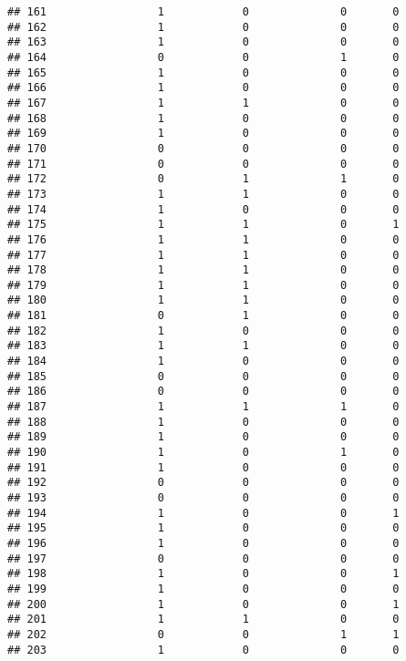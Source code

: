 \documentclass[]{article}
\begin{document}
\begin{verbatim}
## 161                 1            0              0       0
## 162                 1            0              0       0
## 163                 1            0              0       0
## 164                 0            0              1       0
## 165                 1            0              0       0
## 166                 1            0              0       0
## 167                 1            1              0       0
## 168                 1            0              0       0
## 169                 1            0              0       0
## 170                 0            0              0       0
## 171                 0            0              0       0
## 172                 0            1              1       0
## 173                 1            1              0       0
## 174                 1            0              0       0
## 175                 1            1              0       1
## 176                 1            1              0       0
## 177                 1            1              0       0
## 178                 1            1              0       0
## 179                 1            1              0       0
## 180                 1            1              0       0
## 181                 0            1              0       0
## 182                 1            0              0       0
## 183                 1            1              0       0
## 184                 1            0              0       0
## 185                 0            0              0       0
## 186                 0            0              0       0
## 187                 1            1              1       0
## 188                 1            0              0       0
## 189                 1            0              0       0
## 190                 1            0              1       0
## 191                 1            0              0       0
## 192                 0            0              0       0
## 193                 0            0              0       0
## 194                 1            0              0       1
## 195                 1            0              0       0
## 196                 1            0              0       0
## 197                 0            0              0       0
## 198                 1            0              0       1
## 199                 1            0              0       0
## 200                 1            0              0       1
## 201                 1            1              0       0
## 202                 0            0              1       1
## 203                 1            0              0       0

\end{verbatim}
\end{document}
